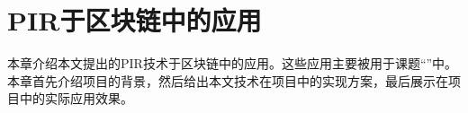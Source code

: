 \chapter{PIR于区块链中的应用}
本章介绍本文提出的PIR技术于区块链中的应用。这些应用主要被用于课题“\projectname”中。本章首先介绍项目的背景，然后给出本文技术在项目中的实现方案，最后展示在项目中的实际应用效果。




